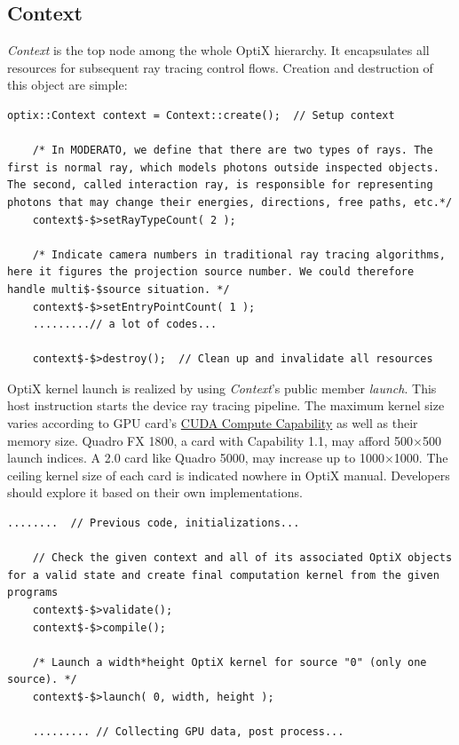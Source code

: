 \subsection{Context}
\textit{Context} is the top node among the whole OptiX hierarchy. It encapsulates all resources for subsequent ray tracing control flows. Creation and destruction of this object are simple:
\begin{lstlisting}[mathescape]
    optix::Context context = Context::create();  // Setup context

    /* In MODERATO, we define that there are two types of rays. The first is normal ray, which models photons outside inspected objects. The second, called interaction ray, is responsible for representing photons that may change their energies, directions, free paths, etc.*/ 
    context$-$>setRayTypeCount( 2 );
    
    /* Indicate camera numbers in traditional ray tracing algorithms, here it figures the projection source number. We could therefore handle multi$-$source situation. */
    context$-$>setEntryPointCount( 1 );
    .........// a lot of codes...
    
    context$-$>destroy();  // Clean up and invalidate all resources 
\end{lstlisting}
OptiX kernel launch is realized by using \textit{Context}'s public member \textit{launch}. This host instruction starts the device ray tracing pipeline. The maximum kernel size varies according to GPU card's \href{http://docs.nvidia.com/cuda/cuda-c-programming-guide/index.html#compute-capabilities}{CUDA Compute Capability} as well as their memory size. Quadro FX 1800, a card with Capability 1.1, may afford 500$\times$500 launch indices. A 2.0 card like Quadro 5000, may increase up to 1000$\times$1000. The ceiling kernel size of each card is indicated nowhere in OptiX manual. Developers should explore it based on their own implementations.
\begin{lstlisting}[mathescape]
    ........  // Previous code, initializations...
    
    // Check the given context and all of its associated OptiX objects for a valid state and create final computation kernel from the given programs
    context$-$>validate();
    context$-$>compile();
    
    /* Launch a width*height OptiX kernel for source "0" (only one source). */
    context$-$>launch( 0, width, height );
    
    ......... // Collecting GPU data, post process...
\end{lstlisting}
